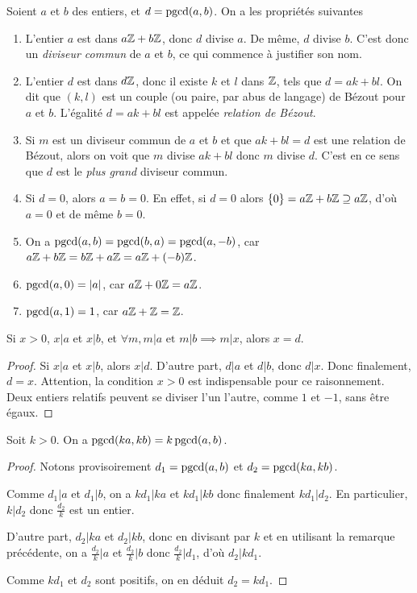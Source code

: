 \begin{proposition}
Soient $a$ et $b$ des entiers, et $d=\operatorname{pgcd}(a,b)$.
On a les propriétés suivantes
\begin{enumerate}
\item L'entier $a$ est dans $a\mathbb{Z}+b\mathbb{Z}$, donc $d$ divise $a$. De même, $d$ divise $b$. C'est donc un \emph{diviseur commun} de $a$ et $b$, ce qui commence à justifier son nom.
\item L'entier $d$ est dans $d\mathbb{Z}$, donc il existe $k$ et $l$ dans $\mathbb{Z}$, tels que $d = ak+bl$. On dit que $(k,l)$ est un couple (ou paire, par abus de langage) de Bézout pour $a$ et $b$. L'égalité $d=ak+bl$ est appelée \emph{relation de Bézout}.
\item Si $m$ est un diviseur commun de $a$ et $b$ et que $ak+bl=d$ est une relation de Bézout, alors on voit que $m$ divise $ak+bl$ donc $m$ divise $d$. C'est en ce sens que $d$ est le \emph{plus grand} diviseur commun.
\item Si $d=0$, alors $a=b=0$. En effet, si $d=0$ alors $\{0\}=a\mathbb{Z}+b\mathbb{Z}\supseteq a\mathbb{Z}$, d'où $a=0$ et de même $b=0$.
\item On a $\operatorname{pgcd}(a,b)=\operatorname{pgcd}(b,a) = \operatorname{pgcd}(a,-b)$, car $a\mathbb{Z}+b\mathbb{Z} = b\mathbb{Z}+a\mathbb{Z}=a\mathbb{Z}+(-b)\mathbb{Z}$.
\item $\operatorname{pgcd}(a,0)=|a|$, car $a\mathbb{Z}+0\mathbb{Z} = a\mathbb{Z}$.
\item $\operatorname{pgcd}(a,1)=1$, car $a\mathbb{Z}+\mathbb{Z} = \mathbb{Z}$.
\end{enumerate}
\end{proposition}

\begin{proposition}
Si $x>0$, $x|a$ et $x|b$, et $\forall m, m|a \text{ et } m|b \implies m|x$, alors $x=d$.
\end{proposition}
\begin{proof}
Si $x|a$ et $x|b$, alors $x|d$. D'autre part, $d|a$ et $d|b$, donc $d|x$. Donc finalement, $d=x$.
Attention, la condition $x>0$ est indispensable pour ce raisonnement. Deux entiers relatifs peuvent se diviser l'un l'autre, comme $1$ et $-1$, sans être égaux.
\end{proof}

\begin{proposition}
Soit $k>0$. On a $\operatorname{pgcd}(ka,kb)=k\operatorname{pgcd}(a,b)$.
\end{proposition}
\begin{proof}
Notons provisoirement $d_1 = \operatorname{pgcd}(a,b)$ et $d_2 = \operatorname{pgcd}(ka,kb)$.

Comme $d_1|a$ et $d_1|b$, on a $kd_1|ka$ et $kd_1|kb$ donc finalement $kd_1|d_2$. En  particulier, $k|d_2$ donc $\frac{d_2}{k}$ est un entier.

D'autre part, $d_2|ka$ et $d_2|kb$, donc  en divisant par $k$ et en utilisant la remarque précédente, on a $\frac{d_2}{k} | a$ et $\frac{d_2}{k} | b$ donc $\frac{d_2}{k} | d_1$, d'où $d_2 | kd_1$. 

Comme $kd_1$ et $d_2$ sont positifs, on en déduit $d_2=kd_1$.
\end{proof}

